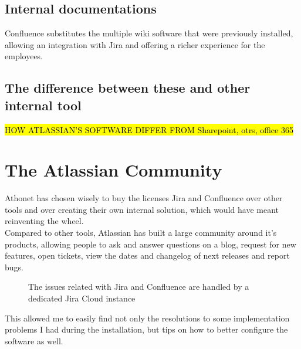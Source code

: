 	\subsection{Internal documentations}
		Confluence substitutes the multiple wiki software that were previously installed, allowing an integration with Jira and offering a richer experience for the employees.
		
	\subsection{The difference between these and other internal tool}
		\hl{HOW ATLASSIAN'S SOFTWARE DIFFER FROM Sharepoint, otrs, office 365}

\section{The Atlassian Community}\label{sec:atlassian_community}
	Athonet has chosen wisely to buy the licenses Jira and Confluence over other tools and over creating their own internal solution, which would have meant reinventing the wheel.\\
	Compared to other tools, Atlassian has built a large community around it's products, allowing people to ask and answer questions on a blog, request for new features, open tickets, view the dates and changelog of next releases and report bugs.
	\begin{figure}[H]
		\centering
		\caption{The issues related with Jira and Confluence are handled by a dedicated Jira Cloud instance}
	\end{figure}
	This allowed me to easily find not only the resolutions to some implementation problems I had during the installation, but tips on how to better configure the software as well.

